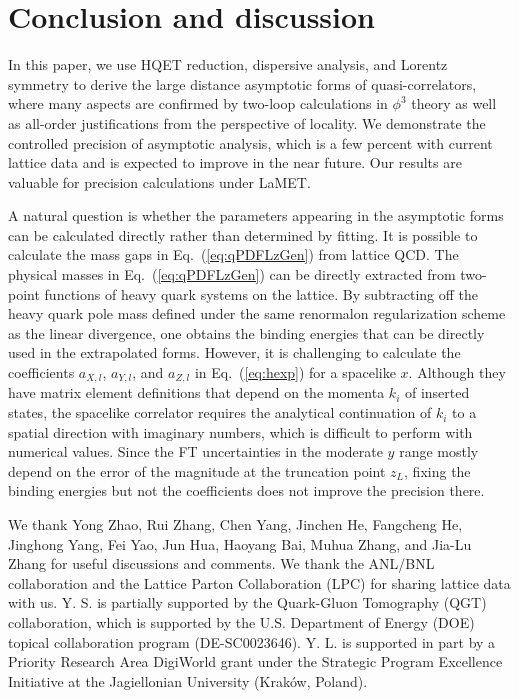 \documentclass[a4paper,11pt]{article}
\begin{document}
\section{Conclusion and discussion}\label{sec:conclusion}
In this paper, we use HQET reduction, dispersive analysis, and Lorentz symmetry to derive the large distance asymptotic forms of quasi-correlators, where many aspects are confirmed by two-loop calculations in $\phi^3$ theory as well as all-order justifications from the perspective of locality. We demonstrate the controlled precision of asymptotic analysis, which is a few percent with current lattice data and is expected to improve in the near future. Our results are valuable for precision calculations under LaMET. 

A natural question is whether the parameters appearing in the asymptotic forms can be calculated directly rather than determined by fitting. It is possible to calculate the mass gaps in Eq.~(\ref{eq:qPDFLzGen}) from lattice QCD. The physical masses in Eq.~(\ref{eq:qPDFLzGen}) can be directly extracted from two-point functions of heavy quark systems on the lattice. By subtracting off the heavy quark pole mass defined under the same renormalon regularization scheme as the linear divergence, one obtains the binding energies that can be directly used in the extrapolated forms. However, it is challenging to calculate the coefficients $a_{X,l}$, $a_{Y,l}$, and $a_{Z,l}$ in Eq.~(\ref{eq:hexp}) for a spacelike $x$. Although they have matrix element definitions that depend on the momenta $k_i$ of inserted states, the spacelike correlator requires the analytical continuation of $k_i$ to a spatial direction with imaginary numbers, which is difficult to perform with numerical values. Since the FT uncertainties in the moderate $y$ range mostly depend on the error of the magnitude at the truncation point $z_L$, fixing the binding energies but not the coefficients does not improve the precision there. 




\acknowledgments
We thank Yong Zhao, Rui Zhang, Chen Yang, Jinchen He, Fangcheng He, Jinghong Yang, Fei Yao, Jun Hua, Haoyang Bai, Muhua Zhang, and Jia-Lu Zhang for useful discussions and comments. We thank the ANL/BNL collaboration and the Lattice Parton Collaboration (LPC) for sharing lattice data with us. Y. S. is partially supported by the Quark-Gluon Tomography (QGT) collaboration, which is supported by the U.S. Department of Energy (DOE) topical collaboration program (DE-SC0023646). Y. L. is supported in part by a Priority Research Area DigiWorld grant under the Strategic Program Excellence Initiative at the Jagiellonian University (Kraków, Poland).
\end{document}
